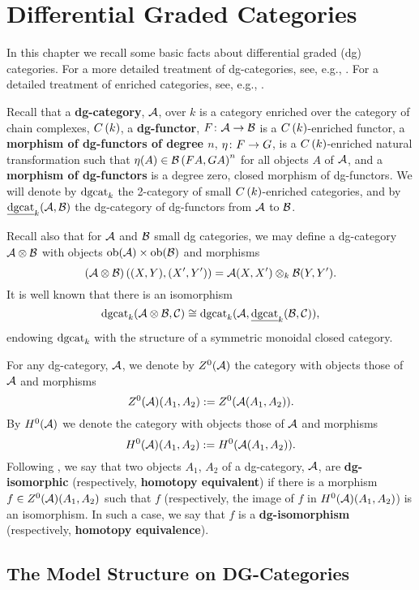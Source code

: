 \chapter{Differential Graded Categories}\label{section: background on dgcats}
In this chapter we recall some basic facts about differential graded (dg) categories.
For a more detailed treatment of dg-categories, see, e.g., \textcite{Keller95,Keller06,Drinfeld04}.
For a detailed treatment of enriched categories, see, e.g., \textcite[Chapter 6]{BorceuxVol2}.

Recall that a \textbf{dg-category}, \(\mathcal{A}\), over \(k\) is a category enriched over the category of chain complexes, \(C\left(k\right)\), a \textbf{dg-functor}, \(F \colon \mathcal{A} \rightarrow \mathcal{B}\) is a \(C\left(k\right)\)-enriched functor, a \textbf{morphism of dg-functors of degree \(n\)}, \(\eta \colon F \rightarrow G\), is a \(C\left(k\right)\)-enriched natural transformation such that \(\eta(A) \in \mathcal{B}\left(FA, GA\right)^n\) for all objects \(A\) of \(\mathcal {\mathcal{A}}\), and a \textbf{morphism of dg-functors} is a degree zero, closed morphism of dg-functors.
We will denote by \(\operatorname{dgcat}_k\) the 2-category of small \(C\left(k\right)\)-enriched categories, and by \(\underline{\operatorname{dgcat}}_{k}(\mathcal{A},\mathcal{B})\) the dg-category of dg-functors from \(\mathcal{A}\) to \(\mathcal{B}\).

Recall also that for \(\mathcal{A}\) and \(\mathcal{B}\) small dg categories, we may define a dg-category \(\mathcal{A} \otimes \mathcal{B}\) with objects \(\operatorname{ob}(\mathcal{A}) \times \operatorname{ob}(\mathcal{B})\) and morphisms
\[(\mathcal{A} \otimes \mathcal{B})\left((X,Y), (X^\prime,Y^\prime)\right) = \mathcal{A}(X,X^\prime) \otimes_k \mathcal{B}(Y, Y^\prime).\]
It is well known that there is an isomorphism
\[\operatorname{dgcat}_k(\mathcal{A} \otimes \mathcal{B}, \mathcal{C}) \cong \operatorname{dgcat}_k(\mathcal{A}, \underline{\operatorname{dgcat}}_{k}(\mathcal{B}, \mathcal{C})),\]
endowing \(\operatorname{dgcat}_k\) with the structure of a symmetric monoidal closed category.

For any dg-category, \(\mathcal{A}\), we denote by \(Z^0(\mathcal{A})\) the category with objects those of \(\mathcal{A}\) and morphisms
\[Z^0(\mathcal{A})(A_1, A_2) := Z^0(\mathcal{A}(A_1,A_2)).\]
By \(H^0(\mathcal{A})\) we denote the category with objects those of \(\mathcal{A}\) and morphisms
\[H^0(\mathcal{A})(A_1, A_2) := H^0(\mathcal{A}(A_1,A_2)).\]
Following \textcite{CS15}, we say that two objects \(A_1\), \(A_2\) of a dg-category, \(\mathcal{A}\), are \textbf{dg-isomorphic} (respectively, \textbf{homotopy equivalent}) if there is a morphism \({f \in Z^0(\mathcal{A})(A_1, A_2)}\) such that \(f\) (respectively, the image of \(f\) in \(H^0(\mathcal{A})(A_1, A_2)\)) is an isomorphism.
In such a case, we say that \(f\) is a \textbf{dg-isomorphism} (respectively, \textbf{homotopy equivalence}).

\section{The Model Structure on DG-Categories}


